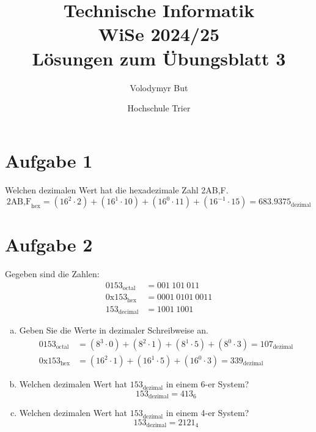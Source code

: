\documentclass[10pt, oneside]{article}
\title{Technische Informatik\\[10pt]\Large{WiSe 2024/25}\\[15pt]\Large{L{\"o}sungen zum {\"U}bungsblatt 3}}
\author{Volodymyr But}
\date{Hochschule Trier}
\begin{document}
\sloppy

\maketitle
\vspace{25px}

\section{Aufgabe 1}

Welchen dezimalen Wert hat die hexadezimale Zahl 2AB,F.
\begin{equation*}
    2\text{AB,F}_{\text{hex}} = (16^2 \cdot 2) + (16^1 \cdot 10) + (16^0 \cdot
    11) + (16^{-1} \cdot 15) = 683.9375_{\text{dezimal}}
\end{equation*}

\section{Aufgabe 2}

Gegeben sind die Zahlen:
\begin{align*}
    0153_{\text{octal}} &= 001\ 101\ 011 \\[5pt]
    0\text{x}153_{\text{hex}}  &= 0001\ 0101\ 0011 \\[5pt]
    153_{\text{decimal}} &= 1001\ 1001
\end{align*}
\begin{enumerate}[(a)]
    \item Geben Sie die Werte in dezimaler Schreibweise an.
        \begin{align*}
            0153_{\text{octal}} &= (8^3 \cdot 0) + (8^2 \cdot 1) + (8^1 \cdot
            5) + (8^0 \cdot 3) = 107_{\text{dezimal}} \\[5pt]
            0\text{x}153_{\text{hex}} &= (16^2 \cdot 1) + (16^1 \cdot 5) +
            (16^0 \cdot 3) = 339_{\text{dezimal}}
        \end{align*}
    \item Welchen dezimalen Wert hat $153_{\text{dezimal}}$ in einem 6-er System?
        \begin{equation*}
            153_{\text{dezimal}} = 413_{6}
        \end{equation*}
    \item Welchen dezimalen Wert hat $153_{\text{dezimal}}$ in einem 4-er System?
        \begin{equation*}
            153_{\text{dezimal}} = 2121_{4}
        \end{equation*}
\end{enumerate}
\end{document}
